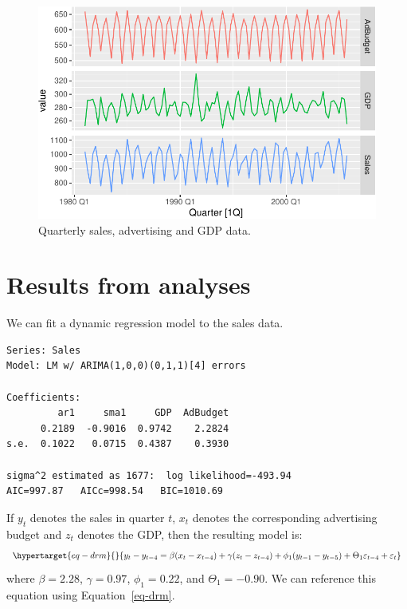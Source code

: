 \documentclass[letterpaper,             %
               oneside,                 %
               \pointsize]              %
               {memoir}
\begin{document}
\begin{figure}

{\centering \includegraphics{index_files/figure-pdf/fig-deaths-1.pdf}

}

\caption{\label{fig-deaths}Quarterly sales, advertising and GDP data.}

\end{figure}

\hypertarget{results-from-analyses}{%
\section{Results from analyses}\label{results-from-analyses}}

We can fit a dynamic regression model to the sales data.

\begin{verbatim}
Series: Sales 
Model: LM w/ ARIMA(1,0,0)(0,1,1)[4] errors 

Coefficients:
         ar1     sma1     GDP  AdBudget
      0.2189  -0.9016  0.9742    2.2824
s.e.  0.1022   0.0715  0.4387    0.3930

sigma^2 estimated as 1677:  log likelihood=-493.94
AIC=997.87   AICc=998.54   BIC=1010.69
\end{verbatim}

If \(y_t\) denotes the sales in quarter \(t\), \(x_t\) denotes the
corresponding advertising budget and \(z_t\) denotes the GDP, then the
resulting model is: \begin{equation}\protect\hypertarget{eq-drm}{}{
  y_t - y_{t-4} = \beta (x_t-x_{t-4}) + \gamma (z_t-z_{t-4}) + \phi_1 (y_{t-1} - y_{t-5}) + \Theta_1 \varepsilon_{t-4} + \varepsilon_t
}\label{eq-drm}\end{equation} where \(\beta = 2.28\), \(\gamma = 0.97\),
\(\phi_1 = 0.22\), and \(\Theta_1 = -0.90\). We can reference this
equation using Equation~\ref{eq-drm}.
\end{document}
